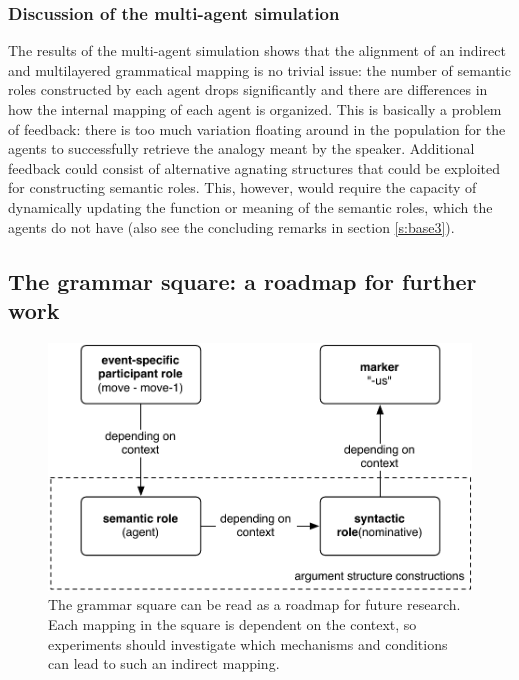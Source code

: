 \subsubsection{Discussion of the multi-agent simulation}
 The results of the multi-agent simulation shows that the alignment of an indirect and multilayered grammatical mapping is no trivial issue: the number of semantic roles constructed by each agent drops significantly and there are differences in how the internal mapping of each agent is organized. This is basically a problem of feedback: there is too much variation floating around in the population for the agents to successfully retrieve the analogy meant by the speaker. Additional feedback could consist of alternative agnating structures that could be exploited for constructing semantic roles. This, however, would require the capacity of dynamically updating the function or meaning of the semantic roles, which the agents do not have (also see the concluding remarks in section \ref{s:base3}).

\subsection{The grammar square: a roadmap for further work}
\label{s:future}

\begin{figure}[t]
\centerline{\includegraphics[scale=0.7]{Chapter4/figs/case}}
  \caption[The grammatical square]{The grammar square can be read as a roadmap for future research. Each mapping in the square is dependent on the context, so experiments should investigate which mechanisms and conditions can lead to such an indirect mapping.}
   \label{f:square-bis}
\end{figure}

